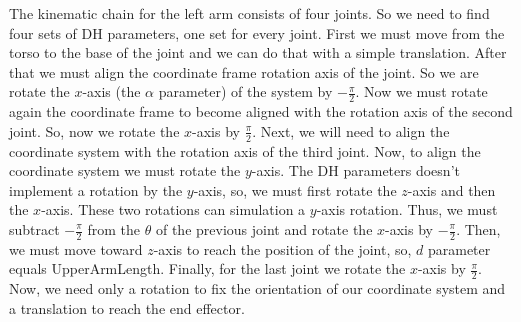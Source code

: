 The kinematic chain for the left arm consists of four joints. So we need to find four sets of DH parameters, one set for every joint. First we must move from the torso to the base of the joint and we can do that with a simple translation. After that we must align the coordinate frame rotation axis of the joint. So we are rotate the $x$-axis (the $\alpha$ parameter) of the system by $-\frac{\pi}{2}$. Now we must rotate again the coordinate frame to become aligned with the rotation axis of the second joint. So, now we rotate the $x$-axis by $\frac{\pi}{2}$. Next, we will need to align the coordinate system with the rotation axis of the third joint. Now, to align the coordinate system we must rotate the $y$-axis. The DH parameters doesn't implement a rotation by the $y$-axis, so, we must first rotate the $z$-axis and then the $x$-axis. These two rotations can simulation a $y$-axis rotation. Thus, we must subtract $-\frac{\pi}{2}$ from the $\theta$ of the previous joint and rotate the $x$-axis by $-\frac{\pi}{2}$. Then, we must move toward $z$-axis to reach the position of the joint, so, $d$ parameter equals UpperArmLength. Finally, for the last joint we rotate the $x$-axis by $\frac{\pi}{2}$. Now, we need only a rotation to fix the orientation of our coordinate system and a translation to reach the end effector.

